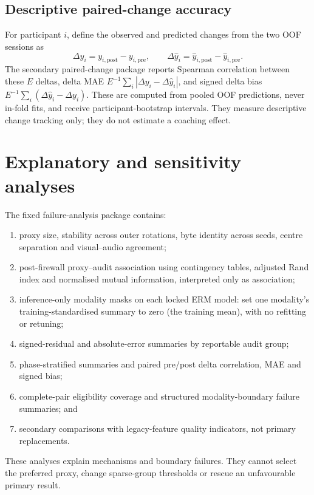 \subsection{Descriptive paired-change accuracy}

For participant $i$, define the observed and predicted changes from the two OOF sessions as
\begin{equation}
    \Delta y_i=y_{i,\mathrm{post}}-y_{i,\mathrm{pre}},\qquad
    \Delta\hat y_i=\hat y_{i,\mathrm{post}}-\hat y_{i,\mathrm{pre}}.
\end{equation}
The secondary paired-change package reports Spearman correlation between these $E$ deltas, delta
MAE $E^{-1}\sum_i|\Delta y_i-\Delta\hat y_i|$, and signed delta bias
$E^{-1}\sum_i(\Delta\hat y_i-\Delta y_i)$. These are computed from pooled OOF predictions, never
in-fold fits, and receive participant-bootstrap intervals. They measure descriptive change
tracking only; they do not estimate a coaching effect.

\section{Explanatory and sensitivity analyses}

The fixed failure-analysis package contains:
\begin{enumerate}
    \item proxy size, stability across outer rotations, byte identity across seeds, centre
    separation and visual--audio agreement;
    \item post-firewall proxy--audit association using contingency tables, adjusted Rand index and
    normalised mutual information, interpreted only as association;
    \item inference-only modality masks on each locked ERM model: set one modality's
    training-standardised summary to zero (the training mean), with no refitting or retuning;
    \item signed-residual and absolute-error summaries by reportable audit group;
    \item phase-stratified summaries and paired pre/post delta correlation, MAE and signed bias;
    \item complete-pair eligibility coverage and structured modality-boundary failure summaries; and
    \item secondary comparisons with legacy-feature quality indicators, not primary replacements.
\end{enumerate}
These analyses explain mechanisms and boundary failures. They cannot select the preferred proxy,
change sparse-group thresholds or rescue an unfavourable primary result.

